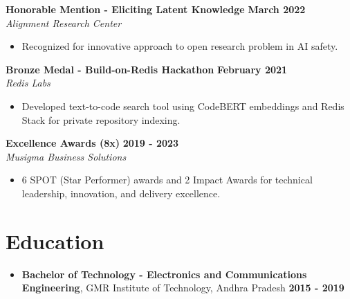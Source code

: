 \documentclass[11pt]{article}
\begin{document}
\textbf{Honorable Mention - Eliciting Latent Knowledge} \hfill \textbf{March 2022} \\
\textit{Alignment Research Center}
\begin{itemize}[leftmargin=*, nosep]
\item Recognized for innovative approach to open research problem in AI safety.
\end{itemize}

\textbf{Bronze Medal - Build-on-Redis Hackathon} \hfill \textbf{February 2021} \\
\textit{Redis Labs}
\begin{itemize}[leftmargin=*, nosep]
\item Developed text-to-code search tool using CodeBERT embeddings and Redis Stack for private repository indexing.
\end{itemize}

\textbf{Excellence Awards (8x)} \hfill \textbf{2019 - 2023} \\
\textit{Musigma Business Solutions}
\begin{itemize}[leftmargin=*, nosep]
\item 6 SPOT (Star Performer) awards and 2 Impact Awards for technical leadership, innovation, and delivery excellence.
\end{itemize}

\section{Education}
\begin{itemize}[leftmargin=*, nosep]
\item \textbf{Bachelor of Technology - Electronics and Communications Engineering}, GMR Institute of Technology, Andhra Pradesh \hfill \textbf{2015 - 2019}
\end{itemize}
\end{document}
